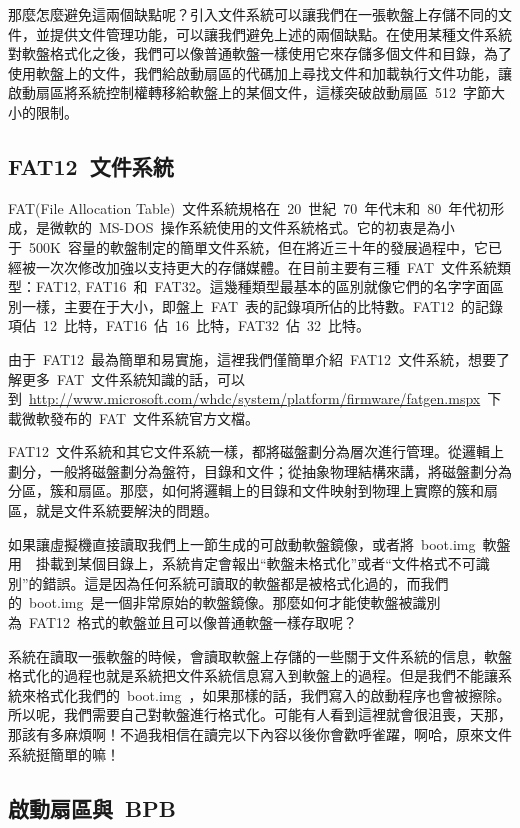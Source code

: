 那麼怎麼避免這兩個缺點呢？引入文件系統可以讓我們在一張軟盤上存儲不同的文件，並提供文件管理功能，可以讓我們避免上述的兩個缺點。在使用某種文件系統對軟盤格式化之後，我們可以像普通軟盤一樣使用它來存儲多個文件和目錄，為了使用軟盤上的文件，我們給啟動扇區的代碼加上尋找文件和加載執行文件功能，讓啟動扇區將系統控制權轉移給軟盤上的某個文件，這樣突破啟動扇區~512~字節大小的限制。

\subsection{FAT12~文件系統}

FAT(File Allocation Table)~文件系統規格在~20~世紀~70~年代末和~80~年代初形成，是微軟的~MS-DOS~操作系統使用的文件系統格式。它的初衷是為小于~500K~容量的軟盤制定的簡單文件系統，但在將近三十年的發展過程中，它已經被一次次修改加強以支持更大的存儲媒體。在目前主要有三種~FAT~文件系統類型：FAT12, FAT16~和~FAT32。這幾種類型最基本的區別就像它們的名字字面區別一樣，主要在于大小，即盤上~FAT~表的記錄項所佔的比特數。FAT12~的記錄項佔~12~比特，FAT16~佔~16~比特，FAT32~佔~32~比特。

由于~FAT12~最為簡單和易實施，這裡我們僅簡單介紹~FAT12~文件系統，想要了解更多~FAT~文件系統知識的話，可以到~\url{http://www.microsoft.com/whdc/system/platform/firmware/fatgen.mspx}~下載微軟發布的~FAT~文件系統官方文檔。

FAT12~文件系統和其它文件系統一樣，都將磁盤劃分為層次進行管理。從邏輯上劃分，一般將磁盤劃分為盤符，目錄和文件；從抽象物理結構來講，將磁盤劃分為分區，簇和扇區。那麼，如何將邏輯上的目錄和文件映射到物理上實際的簇和扇區，就是文件系統要解決的問題。

如果讓虛擬機直接讀取我們上一節生成的可啟動軟盤鏡像，或者將~boot.img~軟盤用~~掛載到某個目錄上，系統肯定會報出“軟盤未格式化”或者“文件格式不可識別”的錯誤。這是因為任何系統可讀取的軟盤都是被格式化過的，而我們的~boot.img~是一個非常原始的軟盤鏡像。那麼如何才能使軟盤被識別為~FAT12~格式的軟盤並且可以像普通軟盤一樣存取呢？

系統在讀取一張軟盤的時候，會讀取軟盤上存儲的一些關于文件系統的信息，軟盤格式化的過程也就是系統把文件系統信息寫入到軟盤上的過程。但是我們不能讓系統來格式化我們的~boot.img~，如果那樣的話，我們寫入的啟動程序也會被擦除。所以呢，我們需要自己對軟盤進行格式化。\blacksmiley 可能有人看到這裡就會很沮喪，天那，那該有多麻煩啊！不過我相信在讀完以下內容以後你會歡呼雀躍，啊哈，原來文件系統挺簡單的嘛！

\subsection{啟動扇區與~BPB}

